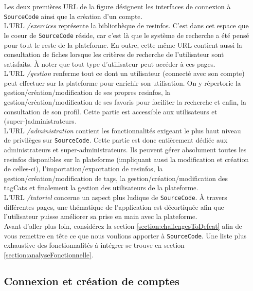 Les deux premières URL de la figure désignent les interfaces de connexion à \texttt{SourceCode} ainsi que la création d'un compte.\\

L'URL \textit{/exercices} représente la bibliothèque de \glspl{resinfo}. C'est dans cet espace que le coeur de \texttt{SourceCode} réside, car c'est là que le système de recherche a été pensé pour tout le reste de la plateforme. En outre,
cette même URL contient aussi la consultation de \glspl{fiche} lorsque les critères de recherche de l'utilisateur sont satisfaits. À noter que tout type d'utilisateur peut accéder à ces pages.\\

L'URL \textit{/gestion} renferme tout ce dont un utilisateur (connecté avec son compte) peut effectuer sur la plateforme pour enrichir son utilisation. On y répertorie la gestion/création/modification de ses propres \glspl{resinfo}, la gestion/création/modification de ses favoris pour faciliter la recherche et enfin, la consultation de son profil. Cette partie est accessible aux utilisateurs et (super-)administrateurs.\\

L'URL \textit{/administration} contient les fonctionnalités exigeant le plus haut niveau de privilèges sur \texttt{SourceCode}. Cette partie est donc entièrement dédiée aux administrateurs et super-administrateurs. Ils peuvent gérer absolument toutes les \glspl{resinfo} disponibles sur la plateforme (impliquant aussi la modification et création de celles-ci), l'importation/exportation de \glspl{resinfo}, la gestion/création/modification de \glspl{tag}, la gestion/création/modification des \glspl{tagCat} et finalement la gestion des utilisateurs de la plateforme.\\

L'URL \textit{/tutoriel} concerne un aspect plus ludique de \texttt{SourceCode}. À travers différentes pages, une thématique de l'application est décortiquée afin que l'utilisateur puisse améliorer sa prise en main avec la plateforme.\\

Avant d'aller plus loin, considérez la section \ref{section:challengesToDefeat} afin de vous remettre en tête ce que nous voulions apporter à \texttt{SourceCode}. Une liste plus exhaustive des fonctionnalités à intégrer se trouve en section \ref{section:analyseFonctionnelle}.

\subsection{Connexion et création de comptes}

